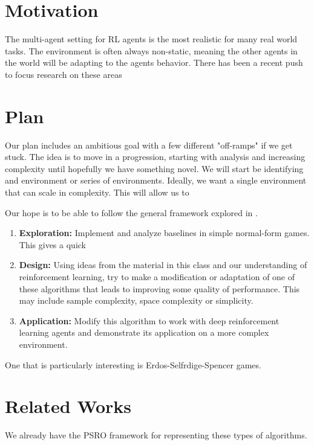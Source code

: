 \documentclass{article}
\begin{document}
\section{Motivation}
The multi-agent setting for RL agents is the most realistic for many real world
tasks. The environment is often always non-static, meaning the other agents in
the world will be adapting to the agents behavior. There has been a recent push
to focus research on these areas

\section{Plan}
Our plan includes an ambitious goal with a few different "off-ramps" if we get
stuck. The idea is to move in a progression, starting with analysis and
increasing complexity until hopefully we have something novel. We will start be
identifying and environment or series of environments. Ideally, we want a single
environment that can scale in complexity. This will allow us to 

Our hope is to be able to follow the general framework explored in \cite{dip}.
\begin{enumerate}
	\item \textbf{Exploration:} Implement and analyze baselines in simple
        normal-form games. This gives a quick 
	\item \textbf{Design:} Using ideas from the material in this class and our
		understanding of reinforcement learning, try to make a modification or
		adaptation of one of these algorithms that leads to improving some
		quality of performance. This may include sample complexity, space complexity or
		simplicity.
    \item \textbf{Application:} Modify this algorithm to work with deep reinforcement learning agents
      and demonstrate its application on a more complex environment.
\end{enumerate}

One that is particularly interesting is Erdos-Selfrdige-Spencer \cite{ESS} games.

\section{Related Works}
We already have the PSRO \cite{PSRO} framework for representing these types of
algorithms. 




\end{document}
